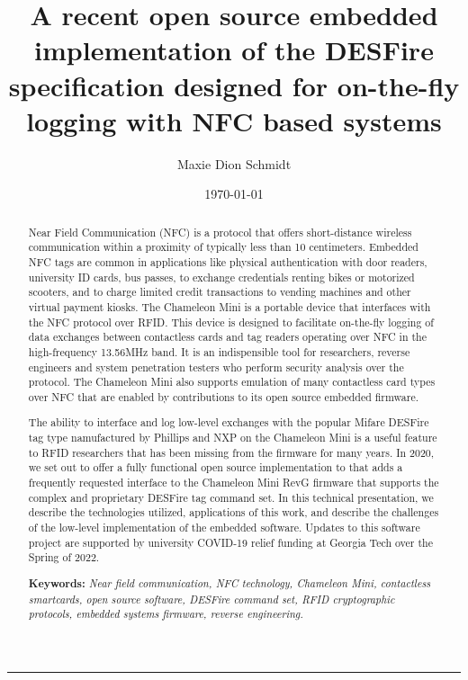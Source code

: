 \documentclass[reqno,11pt]{article}
\title{A recent open source embedded implementation of 
       the DESFire specification designed for on-the-fly logging with 
       NFC based systems}
\author{Maxie Dion Schmidt}
\date{\today}
\theoremstyle{remark}
\begin{document}
\maketitle 
\medskip\hrule\medskip 

\begin{abstract}
\noindent
Near Field Communication (NFC) is a protocol that offers short-distance wireless 
communication within a proximity of typically less than 10 centimeters. 
Embedded NFC tags are common in applications like physical authentication with door readers, university ID cards, 
bus passes, to exchange credentials 
renting bikes or motorized scooters, and to charge limited credit transactions to vending machines 
and other virtual payment kiosks. 
The Chameleon Mini is a portable device that interfaces with the NFC protocol over RFID. 
This device is designed to facilitate on-the-fly logging of data exchanges between 
contactless cards and 
tag readers operating over NFC in the high-frequency 13.56MHz band. It is an indispensible tool 
for researchers, reverse engineers and system penetration testers who 
perform security analysis over the protocol.
The Chameleon Mini also supports emulation of many contactless card types over NFC that 
are enabled by contributions to its open source embedded firmware. 

The ability to interface and log low-level exchanges with the popular Mifare DESFire tag type 
namufactured by Phillips and NXP on the Chameleon Mini is a useful feature to RFID 
researchers that has been missing from the firmware for many years. 
In 2020, we set out to offer a fully functional open source implementation 
to that adds a frequently requested interface to the Chameleon Mini RevG firmware 
that supports the complex and proprietary DESFire tag command set. 
In this technical presentation, we describe the technologies utilized, applications of this work, 
and describe the challenges of the low-level implementation of the embedded software. 
Updates to this software project are supported by university COVID-19 relief funding 
at Georgia Tech over the Spring of 2022.

\bigskip\noindent
\textbf{Keywords:} 
{\it 
Near field communication, NFC technology, Chameleon Mini, 
contactless smartcards, open source software, DESFire command set, 
RFID cryptographic protocols, embedded systems firmware, reverse engineering.
}


\end{abstract}
\end{document}
